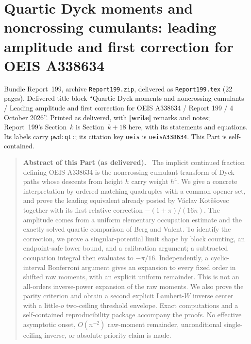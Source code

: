\documentclass[11pt,letterpaper]{article}
\numberwithin{equation}{section}
\theoremstyle{remark}\newtheorem{remark}[theorem]{Remark}
\newcommand{\file}[1]{\nolinkurl{#1}}
\newenvironment{partabstract}{\begin{quote}\small\noindent\textbf{Abstract of this Part (as delivered).}\ }{\end{quote}}
\newcommand{\partsource}[1]{\par\noindent\begin{minipage}{\textwidth}\small #1\end{minipage}\par\medskip}
\begin{document}
\part{Quartic Dyck moments and noncrossing cumulants: leading amplitude and first correction for OEIS A338634}\label{pwd:qt:part}
\partsource{Bundle Report~199, archive \file{Report199.zip}, delivered as \file{Report199.tex} (22 pages). Delivered title block ``Quartic Dyck moments and noncrossing cumulants / Leading amplitude and first correction for OEIS A338634 / Report 199 / 4 October 2026''. Printed as delivered, with \textbf{[write]} remarks and notes; Report~199's Section~$k$ is Section~$k+18$ here, with its statements and equations. Its labels carry \file{pwd:qt:}; its citation key \file{oeis} is \file{oeisA338634}. This Part is self-contained.}
\begin{partabstract}
The implicit continued fraction defining OEIS A338634 is the noncrossing cumulant transform of Dyck paths whose descents from height $h$ carry weight $h^4$. We give a concrete interpretation by ordered matching quadruples with a common opener set, and prove the leading equivalent already posted by V\'aclav Kot\v e\v sovec together with its first relative correction $-(1+\pi)/(16n)$. The amplitude comes from a uniform elementary occupation estimate and the exactly solved quartic comparison of Berg and Valent. To identify the correction, we prove a singular-potential limit shape by block counting, an endpoint-safe lower bound, and a calibration argument; a subtracted occupation integral then evaluates to $-\pi/16$. Independently, a cyclic-interval Bonferroni argument gives an expansion to every fixed order in shifted raw moments, with an explicit uniform remainder. This is not an all-orders inverse-power expansion of the raw moments. We also prove the parity criterion and obtain a second explicit Lambert-$W$ inverse center with a little-$o$ two-ceiling threshold envelope. Exact computations and a self-contained reproducibility package accompany the proofs. No effective asymptotic onset, $O(n^{-2})$ raw-moment remainder, unconditional single-ceiling inverse, or absolute priority claim is made.
\end{partabstract}
\end{document}
